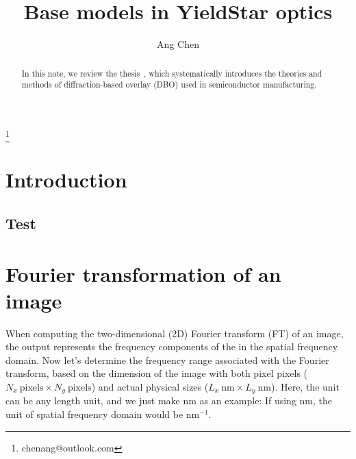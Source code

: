 \documentclass[pra,superscriptaddress,reprint]{revtex4-1}
\begin{document}
\title{\Large Base models in YieldStar optics}

\author{Ang Chen}
\thanks{chenang@outlook.com}


\begin{abstract}
In this note, we review the thesis~\cite{swinkels2021spectral}, which systematically introduces the theories and methods
of diffraction-based overlay (DBO) used in semiconductor manufacturing.
\end{abstract}

\maketitle


\section{Introduction~\label{sec:1}}
\subsection{Test}




\appendix

\section{Fourier transformation of an image~\label{sec-a:ft-an0image}}
When computing the two-dimensional (2D) Fourier transform (FT) of an image, the output represents the frequency
components of the  in the spatial frequency domain.
Now let's determine the frequency range associated with the Fourier transform, based on the dimension of the image
with both pixel pixels ($N_x~\text{pixels}\times N_y~\text{pixels}$) 
and actual physical sizes ($L_x~\text{nm}\times L_y~\text{nm}$).
Here, the unit can be any length unit, and we just make nm as an example: 
If using nm, the unit of spatial frequency domain would be nm$^{-1}$.
\end{document}
